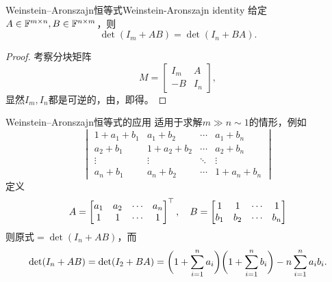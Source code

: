 \begin{theorem}
	{Weinstein--Aronszajn恒等式}{Weinstein-Aronszajn identity}
	给定$A \in \mathbb{F}^{m\times n},B \in \mathbb{F}^{n\times m}$，则
	\begin{equation}
		\label{eqn:det(I+AB)=det(I+BA)}
		\det(I_m + AB) = \det(I_n + BA).
	\end{equation}
\end{theorem}
\begin{proof}
	考察分块矩阵
	\[
		M = \begin{bmatrix}
			I_m&A\\-B&I_n
		\end{bmatrix},
	\]
	显然$I_m,I_n$都是可逆的，由，即得。
\end{proof}

\begin{example}
	{Weinstein--Aronszajn恒等式的应用}{}
	 适用于求解$m \gg n \sim 1$的情形，例如
	\[
		\begin{vmatrix}
			1 + a_1 + b_1&a_1 + b_2&\cdots&a_1 + b_n\\
			a_2 + b_1&1 + a_2 + b_2&\cdots&a_2 + b_n\\
			\vdots&\vdots&\ddots&\vdots\\
			a_n + b_1&a_n + b_2&\cdots&1 + a_n + b_n
		\end{vmatrix}
	\]
	定义 
	\[
		A = \begin{bmatrix}
			a_1&a_2&\cdots&a_n\\
			1&1&\cdots&1
		\end{bmatrix}^\top,\quad
		B = \begin{bmatrix}
			1&1&\cdots&1\\
			b_1&b_2&\cdots&b_n
		\end{bmatrix}
	\]
	则原式$= \det(I_n + AB)$，而
	\[
		\det(I_n + AB) = \det(I_2 + BA) = \biggl(1 + \sum_{i=1}^na_i\biggr)\biggl(1 + \sum_{i=1}^nb_i\biggr) - n\sum_{i=1}^na_ib_i.
	\]
\end{example}

